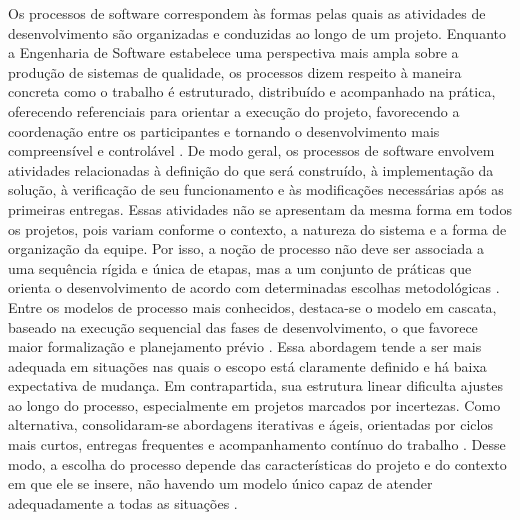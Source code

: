 Os processos de software correspondem às formas pelas quais as atividades de desenvolvimento são organizadas e conduzidas ao longo de um projeto. Enquanto a Engenharia de Software estabelece uma perspectiva mais ampla sobre a produção de sistemas de qualidade, os processos dizem respeito à maneira concreta como o trabalho é estruturado, distribuído e acompanhado na prática, oferecendo referenciais para orientar a execução do projeto, favorecendo a coordenação entre os participantes e tornando o desenvolvimento mais compreensível e controlável \cite{perry2000,scacchi2002,ralph2016}.
De modo geral, os processos de software envolvem atividades relacionadas à definição do que será construído, à implementação da solução, à verificação de seu funcionamento e às modificações necessárias após as primeiras entregas. Essas atividades não se apresentam da mesma forma em todos os projetos, pois variam conforme o contexto, a natureza do sistema e a forma de organização da equipe. Por isso, a noção de processo não deve ser associada a uma sequência rígida e única de etapas, mas a um conjunto de práticas que orienta o desenvolvimento de acordo com determinadas escolhas metodológicas \cite{sommerville2016,swebok2024}.
Entre os modelos de processo mais conhecidos, destaca-se o modelo em cascata, baseado na execução sequencial das fases de desenvolvimento, o que favorece maior formalização e planejamento prévio \cite{royce1970}. Essa abordagem tende a ser mais adequada em situações nas quais o escopo está claramente definido e há baixa expectativa de mudança. Em contrapartida, sua estrutura linear dificulta ajustes ao longo do processo, especialmente em projetos marcados por incertezas. Como alternativa, consolidaram-se abordagens iterativas e ágeis, orientadas por ciclos mais curtos, entregas frequentes e acompanhamento contínuo do trabalho \cite{boehm1988,agilemanifesto2001}. Desse modo, a escolha do processo depende das características do projeto e do contexto em que ele se insere, não havendo um modelo único capaz de atender adequadamente a todas as situações \cite{sommerville2016}.

